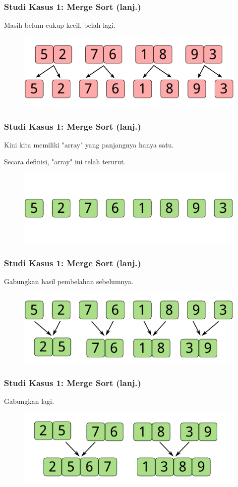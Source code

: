 \begin{frame}
\frametitle{Studi Kasus 1: Merge Sort (lanj.)}
Masih belum cukup kecil, belah lagi.
\begin{figure}
  \centering
  \includegraphics[width=10 cm]{asset/merge-sort-demo-3.pdf}
\end{figure}
\end{frame}

\begin{frame}
\frametitle{Studi Kasus 1: Merge Sort (lanj.)}
Kini kita memiliki "array" yang panjangnya hanya satu.\newline

Secara definisi, "array" ini telah terurut.
\begin{figure}
  \centering
  \includegraphics[width=10 cm]{asset/merge-sort-demo-4.pdf}
\end{figure}
\end{frame}

\begin{frame}
\frametitle{Studi Kasus 1: Merge Sort (lanj.)}
Gabungkan hasil pembelahan sebelumnya.
\begin{figure}
  \centering
  \includegraphics[width=10 cm]{asset/merge-sort-demo-5.pdf}
\end{figure}
\end{frame}

\begin{frame}
\frametitle{Studi Kasus 1: Merge Sort (lanj.)}
Gabungkan lagi.
\begin{figure}
  \centering
  \includegraphics[width=10 cm]{asset/merge-sort-demo-6.pdf}
\end{figure}
\end{frame}

